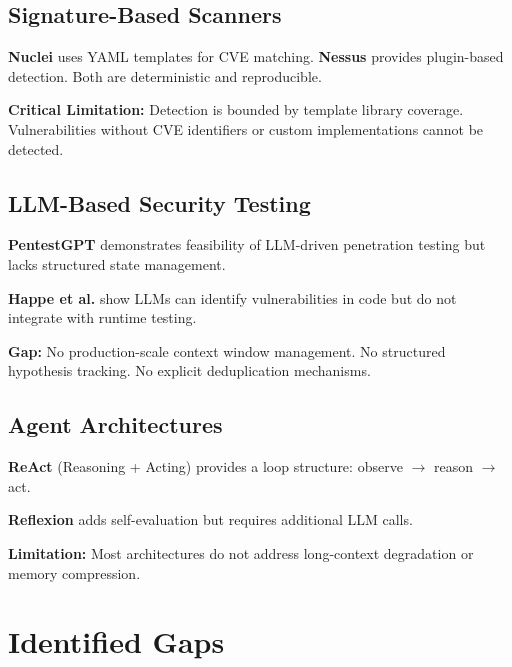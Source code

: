 \documentclass[11pt,a4paper]{article}
\theoremstyle{definition}
\begin{document}
\subsection{Signature-Based Scanners}

\textbf{Nuclei} uses YAML templates for CVE matching. \textbf{Nessus} provides plugin-based detection. Both are deterministic and reproducible.

\textbf{Critical Limitation:} Detection is bounded by template library coverage. Vulnerabilities without CVE identifiers or custom implementations cannot be detected.

\subsection{LLM-Based Security Testing}

\textbf{PentestGPT} demonstrates feasibility of LLM-driven penetration testing but lacks structured state management.

\textbf{Happe et al.} show LLMs can identify vulnerabilities in code but do not integrate with runtime testing.

\textbf{Gap:} No production-scale context window management. No structured hypothesis tracking. No explicit deduplication mechanisms.

\subsection{Agent Architectures}

\textbf{ReAct} (Reasoning + Acting) provides a loop structure: observe $\rightarrow$ reason $\rightarrow$ act.

\textbf{Reflexion} adds self-evaluation but requires additional LLM calls.

\textbf{Limitation:} Most architectures do not address long-context degradation or memory compression.

\section{Identified Gaps}
\label{sec:gaps}
\end{document}
